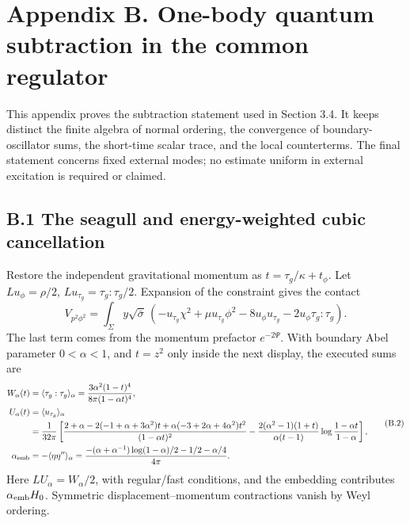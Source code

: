 \documentclass[a4paper,11pt]{article}
\numberwithin{equation}{section}
\begin{document}
\clearpage
\hypertarget{appendix-b.-one-body-quantum-subtraction-in-the-common-regulator}{%
\section{Appendix B. One-body quantum subtraction in the common regulator}\label{appendix-b.-one-body-quantum-subtraction-in-the-common-regulator}}

This appendix proves the subtraction statement used in Section 3.4. It keeps distinct the finite algebra of normal ordering, the convergence of boundary-oscillator sums, the short-time scalar trace, and the local counterterms. The final statement concerns fixed external modes; no estimate uniform in external excitation is required or claimed.

\hypertarget{b.1-the-seagull-and-energy-weighted-cubic-cancellation}{%
\subsection{B.1 The seagull and energy-weighted cubic cancellation}\label{b.1-the-seagull-and-energy-weighted-cubic-cancellation}}

Restore the independent gravitational momentum as \(t=\tau_g/\kappa+t_\phi\). Let \(Lu_\phi=\rho/2\), \(Lu_{\tau_g}=\tau_g:\tau_g/2\). Expansion of the constraint gives the contact \[
V_{p^2\phi^2}
=\int_\Sigma y\sqrt{\bar\sigma}\,
(-u_{\tau_g}\chi^2+\mu u_{\tau_g}\phi^2
-8u_\phi u_{\tau_g}-2u_\phi\tau_g:\tau_g).
\tag{B.1}
\] The last term comes from the momentum prefactor \(e^{-2\Psi}\). With boundary Abel parameter \(0<\alpha<1\), and \(t=z^2\) only inside the next display, the executed sums are \begingroup
\small
\[
\begin{aligned}
W_\alpha(t)&=\langle\tau_g:\tau_g\rangle_\alpha
=\frac{3\alpha^2(1-t)^4}{8\pi(1-\alpha t)^4},\\
U_\alpha(t)&=\langle u_{\tau_g}\rangle_\alpha\\
&=\frac1{32\pi}\left[
\frac{2+\alpha-2(-1+\alpha+3\alpha^2)t
+\alpha(-3+2\alpha+4\alpha^2)t^2}{(1-\alpha t)^2}
-\frac{2(\alpha^2-1)(1+t)}{\alpha(t-1)}
\log\frac{1-\alpha t}{1-\alpha}\right],\\
\alpha_{\rm emb}
&=-\langle\eta\eta''\rangle_\alpha
=\frac{-(\alpha+\alpha^{-1})\log(1-\alpha)/2-1/2-\alpha/4}
{4\pi}.
\end{aligned}
\tag{B.2}
\]
\endgroup Here \(LU_\alpha=W_\alpha/2\), with regular/fast conditions, and the embedding contributes \(\alpha_{\rm emb}H_0\). Symmetric displacement--momentum contractions vanish by Weyl ordering.
\end{document}
